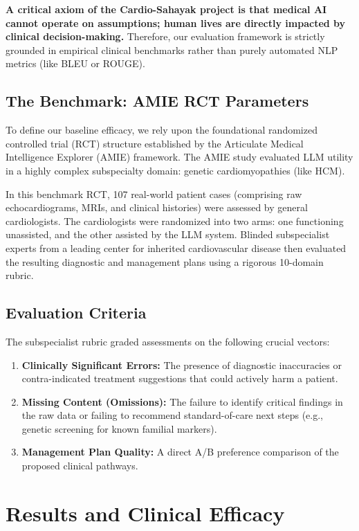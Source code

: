 \documentclass[11pt,a4paper]{article}
\begin{document}
\textbf{A critical axiom of the Cardio-Sahayak project is that medical AI cannot operate on assumptions; human lives are directly impacted by clinical decision-making.} Therefore, our evaluation framework is strictly grounded in empirical clinical benchmarks rather than purely automated NLP metrics (like BLEU or ROUGE).

\subsection{The Benchmark: AMIE RCT Parameters}
To define our baseline efficacy, we rely upon the foundational randomized controlled trial (RCT) structure established by the Articulate Medical Intelligence Explorer (AMIE) framework. The AMIE study evaluated LLM utility in a highly complex subspecialty domain: genetic cardiomyopathies (like HCM). 

In this benchmark RCT, 107 real-world patient cases (comprising raw echocardiograms, MRIs, and clinical histories) were assessed by general cardiologists. The cardiologists were randomized into two arms: one functioning unassisted, and the other assisted by the LLM system. Blinded subspecialist experts from a leading center for inherited cardiovascular disease then evaluated the resulting diagnostic and management plans using a rigorous 10-domain rubric.

\subsection{Evaluation Criteria}
The subspecialist rubric graded assessments on the following crucial vectors:
\begin{enumerate}
    \item \textbf{Clinically Significant Errors:} The presence of diagnostic inaccuracies or contra-indicated treatment suggestions that could actively harm a patient.
    \item \textbf{Missing Content (Omissions):} The failure to identify critical findings in the raw data or failing to recommend standard-of-care next steps (e.g., genetic screening for known familial markers).
    \item \textbf{Management Plan Quality:} A direct A/B preference comparison of the proposed clinical pathways.
\end{enumerate}

\section{Results and Clinical Efficacy}
\end{document}
